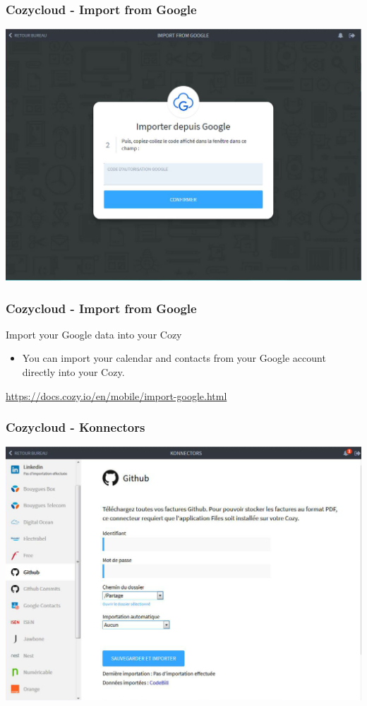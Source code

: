 \documentclass{beamer}
\begin{document}
\begin{frame}
\frametitle{Cozycloud - Import from Google}
\includegraphics[scale=0.3] {./CozyCloud/CozyCloud_Import_From_Google.jpg}
\end{frame}


\begin{frame}
\frametitle{Cozycloud - Import from Google}
\begin{block}{Import your Google data into your Cozy}
\begin{itemize}
\item You can import your calendar and contacts from your Google account directly into your Cozy.
\end{itemize}
\url{https://docs.cozy.io/en/mobile/import-google.html}
\end{block}
\end{frame}


\begin{frame}
\frametitle{Cozycloud - Konnectors}
\includegraphics[scale=0.3] {./CozyCloud/CozyCloud_Konnectors.jpg}
\end{frame}
\end{document}
